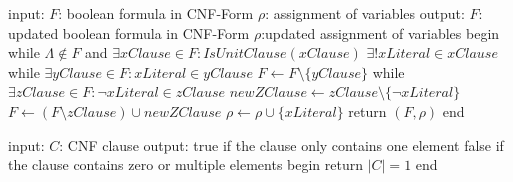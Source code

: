 \begin{algorithm}[caption={UnitPropagate}, label={algUnitProgagate}]
 input: $F$: boolean formula in CNF-Form
	$\rho$: assignment of variables
 output: $F$: updated boolean formula in CNF-Form
	$\rho$:updated assignment of variables
 begin
   while $\Lambda \notin F$ and $\exists xClause \in F: IsUnitClause(xClause)$
	$\exists! xLiteral \in xClause$
	while $\exists yClause \in F: xLiteral \in yClause$
		$F \gets F \setminus \{yClause\}$     
	while $\exists zClause \in F: \lnot xLiteral \in zClause$
		$newZClause \gets zClause \setminus \{\lnot xLiteral\}$
		$F \gets (F \setminus zClause) \cup newZClause$
	$\rho \gets \rho \cup \{xLiteral\}$
   return $(F, \rho)$
 end
\end{algorithm}
\begin{algorithm}[caption={IsUnitClause}, label={algIsUnitClause}]
 input: $C$: CNF clause
 output: true if the clause only contains one element
	false if the clause contains zero 
		or multiple elements
 begin
   return $|C| = 1$
 end
\end{algorithm}